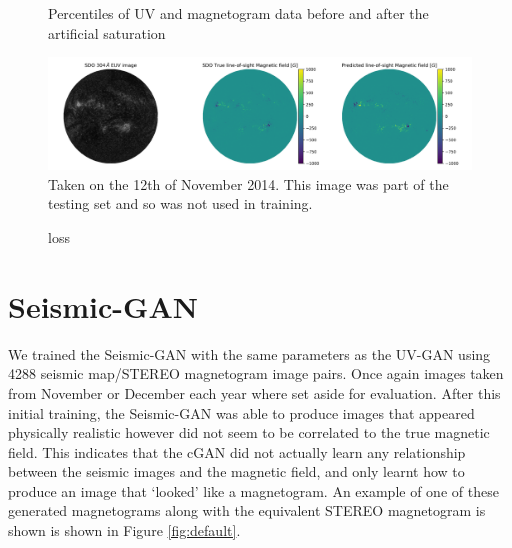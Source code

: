 \documentclass[11pt,a4paper,onecolumn]{report}
\begin{document}
\begin{figure}
  \centering
  
  \caption{Percentiles of UV and magnetogram data before and after the artificial saturation}
  \label{fig:artificial_sat}
\end{figure}



\begin{figure}[t]%
  \includegraphics[width=\linewidth]{aia_hmi_mag.png}
  \caption[]{Taken on the 12th of November 2014. This image was part of the
  testing set and so was not used in training.}
  \label{fig:aia_hmi_mag}
\end{figure}

\begin{figure}[t]
  \centering
  
  \caption{%
  }
  \label{fig:stereo_mag}
\end{figure}

\begin{figure}[htbp]
  \centering
  
  \caption{loss}
  \label{fig:uv_loss}
\end{figure}

\section{Seismic-GAN}


We trained the Seismic-GAN with the same parameters as the UV-GAN using 4288
seismic map/STEREO magnetogram image pairs. Once again images taken from
November or December each year where set aside for evaluation. After this
initial training, the Seismic-GAN was able to produce images that appeared
physically realistic however did not seem to be correlated to the true magnetic
field. This indicates that the cGAN did not actually learn any relationship
between the seismic images and the magnetic field, and only learnt how to
produce an image that `looked' like a magnetogram. An example of one of these
generated magnetograms along with the equivalent STEREO magnetogram is shown is
shown in Figure \ref{fig:default}. \\
\end{document}
